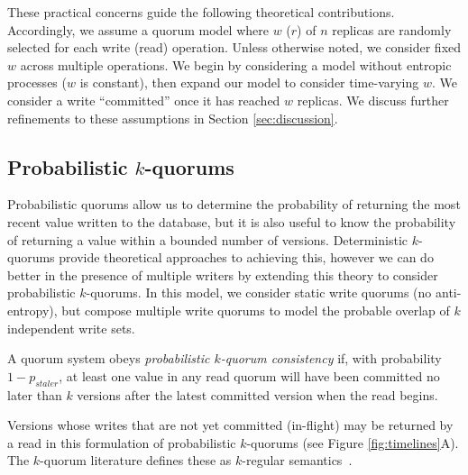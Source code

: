 \documentclass{vldb}
\begin{document}
These practical concerns guide the following theoretical
contributions.  Accordingly, we assume a quorum model where $w$ ($r$)
of $n$ replicas are randomly selected for each write (read) operation.
Unless otherwise noted, we consider fixed $w$ across multiple
operations.  We begin by considering a model without entropic
processes ($w$ is constant), then expand our model to consider
time-varying $w$. We consider a write ``committed'' once it has
reached $w$ replicas. We discuss further refinements to these
assumptions in Section \ref{sec:discussion}.

\subsection{Probabilistic $k$-quorums}

Probabilistic quorums allow us to determine the probability of
returning the most recent value written to the database, but it is
also useful to know the probability of returning a value within a
bounded number of versions.  Deterministic $k$-quorums provide
theoretical approaches to achieving this, however we can do better in
the presence of multiple writers by extending this theory to consider
probabilistic $k$-quorums.  In this model, we consider static write
quorums (no anti-entropy), but compose multiple write quorums to model the probable overlap of $k$ independent write sets.
\begin{definition}
A quorum system obeys \textit{probabilistic $k$-quorum consistency} if, with
probability $1-p_{staler}$, at least one value in any read quorum will
have been committed no later than $k$ versions after the latest committed
version when the read begins.
\end{definition}
Versions whose writes that are not yet committed (in-flight) may be
returned by a read in this formulation of probabilistic $k$-quorums
(see Figure \ref{fig:timelines}A).  The $k$-quorum literature defines these as $k$-regular semantics~\cite{nonstrict-availability}.
\end{document}
